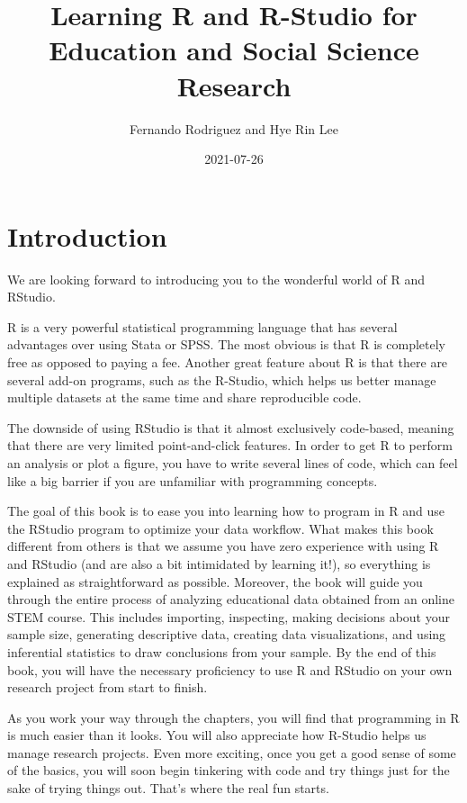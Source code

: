 \documentclass[
]{book}
\title{Learning R and R-Studio for Education and Social Science Research}
\author{Fernando Rodriguez and Hye Rin Lee}
\date{2021-07-26}
\begin{document}
\maketitle

{
\setcounter{tocdepth}{1}
\tableofcontents
}
\hypertarget{introduction}{%
\chapter{Introduction}\label{introduction}}

We are looking forward to introducing you to the wonderful world of R and RStudio.

R is a very powerful statistical programming language that has several advantages over using Stata or SPSS. The most obvious is that R is completely free as opposed to paying a fee. Another great feature about R is that there are several add-on programs, such as the R-Studio, which helps us better manage multiple datasets at the same time and share reproducible code.

The downside of using RStudio is that it almost exclusively code-based, meaning that there are very limited point-and-click features. In order to get R to perform an analysis or plot a figure, you have to write several lines of code, which can feel like a big barrier if you are unfamiliar with programming concepts.

The goal of this book is to ease you into learning how to program in R and use the RStudio program to optimize your data workflow. What makes this book different from others is that we assume you have zero experience with using R and RStudio (and are also a bit intimidated by learning it!), so everything is explained as straightforward as possible. Moreover, the book will guide you through the entire process of analyzing educational data obtained from an online STEM course. This includes importing, inspecting, making decisions about your sample size, generating descriptive data, creating data visualizations, and using inferential statistics to draw conclusions from your sample. By the end of this book, you will have the necessary proficiency to use R and RStudio on your own research project from start to finish.

As you work your way through the chapters, you will find that programming in R is much easier than it looks. You will also appreciate how R-Studio helps us manage research projects. Even more exciting, once you get a good sense of some of the basics, you will soon begin tinkering with code and try things just for the sake of trying things out. That's where the real fun starts.
\end{document}
